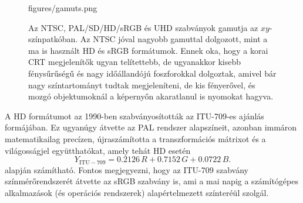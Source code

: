 \begin{figure}[]
	\centering
	\begin{overpic}[width = 0.7\columnwidth ]{figures/gamuts.png}
	\end{overpic}
	\caption{Az NTSC, PAL/SD/HD/sRGB és UHD szabványok gamutja az $xy$-színpatkóban.
	Az NTSC jóval nagyobb gamuttal dolgozott, mint a ma is használt HD és sRGB formátumok. Ennek oka, hogy a korai CRT megjelenítők ugyan telítettebb, de ugyanakkor kisebb fénysűrűségű és nagy időállandójú foszforokkal dolgoztak, amivel bár nagy színtartományt tudtak megjeleníteni, de kis fényerővel, és mozgó objektumoknál a képernyőn akaratlanul is nyomokat hagyva.}
	\label{Fig:gamut}
\end{figure}

A HD formátumot az 1990-ben szabványosították az ITU-709-es ajánlás formájában.
Ez ugyanúgy átvette az PAL rendszer alapszíneit, azonban immáron matematikailag precízen, újraszámította a transzformációs mátrixot és a világosságjel együtthatókat, amely tehát HD esetén
\begin{equation}Y_{\mathrm{ITU}-709} = 
   0.2126\,R + 0.7152\,G + 0.0722\,B. 
\label{Eq:NTSC_luminance}
\end{equation}
alapján számítható.
Fontos megjegyezni, hogy az ITU-709 szabvány színmérőrendszerét átvette az sRGB szabvány is, ami a mai napig a számítógépes alkalmazások (és operációs rendszerek) alapértelmezett színteréül szolgál.

